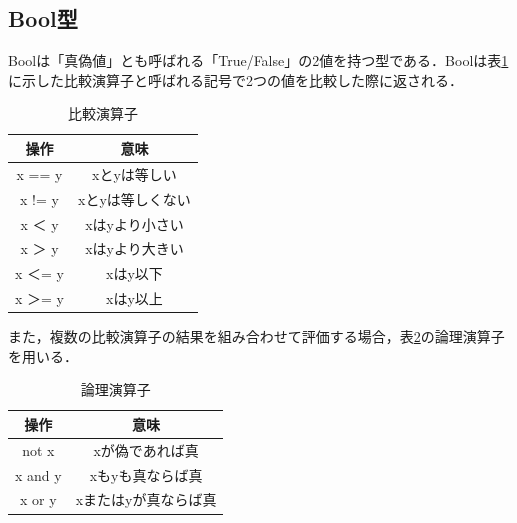 \documentclass[11pt]{jarticle}
\begin{document}
\subsection{Bool型}
Boolは「真偽値」とも呼ばれる「True/False」の2値を持つ型である．Boolは表\ref{comparative operator}に示した比較演算子と呼ばれる記号で2つの値を比較した際に返される．
\begin{table}[h]
 \centering
   \caption{比較演算子}
    \begin{tabular}{|c|c|} \hline
     操作 & 意味 \\ \hline \hline
     x == y & xとyは等しい \\ \hline
     x != y & xとyは等しくない \\ \hline
     x ＜ y & xはyより小さい \\ \hline
     x ＞ y & xはyより大きい \\ \hline
     x ＜= y & xはy以下 \\ \hline
     x ＞= y & xはy以上 \\ \hline
    \end{tabular}
   \label{comparative operator}
\end{table}


また，複数の比較演算子の結果を組み合わせて評価する場合，表\ref{logical operator}の論理演算子を用いる．
\begin{table}[h]
 \centering
  \caption{論理演算子}
   \begin{tabular}{|c|c|} \hline
   操作 & 意味 \\ \hline \hline
   not x & xが偽であれば真 \\ \hline
   x and y & xもyも真ならば真 \\ \hline
   x or y & xまたはyが真ならば真 \\ \hline
   \end{tabular}
  \label{logical operator}
\end{table}

\end{document}
